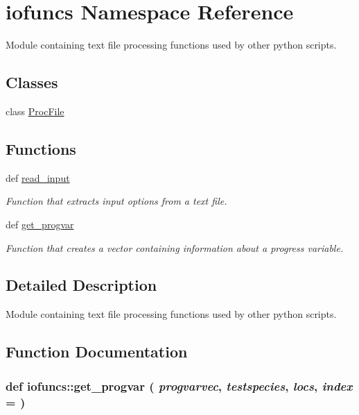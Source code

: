 \hypertarget{namespaceiofuncs}{
\section{iofuncs Namespace Reference}
\label{d7/dcd/namespaceiofuncs}
}


Module containing text file processing functions used by other python scripts.  


\subsection*{Classes}
\begin{DoxyCompactItemize}
\item 
class \hyperlink{classiofuncs_1_1ProcFile}{ProcFile}
\end{DoxyCompactItemize}
\subsection*{Functions}
\begin{DoxyCompactItemize}
\item 
def \hyperlink{namespaceiofuncs_afcd921653dd1ba4c990aac881b097a51}{read\_\-input}
\begin{DoxyCompactList}\small\item\em Function that extracts input options from a text file. \item\end{DoxyCompactList}\item 
def \hyperlink{namespaceiofuncs_a2f7833c4d48c6ded0a5e5be1ea1ab672}{get\_\-progvar}
\begin{DoxyCompactList}\small\item\em Function that creates a vector containing information about a progress variable. \item\end{DoxyCompactList}\end{DoxyCompactItemize}


\subsection{Detailed Description}
Module containing text file processing functions used by other python scripts. 

\subsection{Function Documentation}
\hypertarget{namespaceiofuncs_a2f7833c4d48c6ded0a5e5be1ea1ab672}{
\subsubsection[{get\_\-progvar}]{\setlength{\rightskip}{0pt plus 5cm}def iofuncs::get\_\-progvar ( {\em progvarvec}, \/   {\em testspecies}, \/   {\em locs}, \/   {\em index} = {})}}
\label{d7/dcd/namespaceiofuncs_a2f7833c4d48c6ded0a5e5be1ea1ab672}


